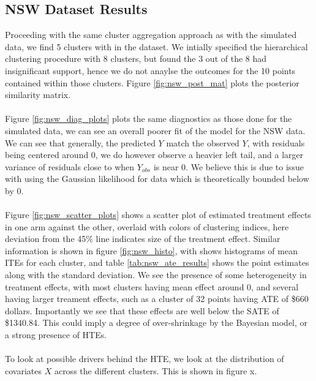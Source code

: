 \documentclass{article}
\begin{document}
\subsection{NSW Dataset Results} 
Proceeding with the same cluster aggregation approach as with the simulated data, we find 5 clusters with in the dataset. We intially specified the hierarchical clustering procedure with 8 clusters, but found the 3 out of the 8 had insignificant support, hence we do not anaylse the outcomes for the 10 points contained within those clusters. Figure \ref{fig:nsw_post_mat} plots the posterior similarity matrix. 
\\ \\
Figure \ref{fig:nsw_diag_plots} plots the same diagnostics as those done for the simulated data, we can see an overall poorer fit of the model for the NSW data. We can see that generally, the predicted $Y$ match the observed $Y$, with residuals being centered around 0, we do however observe a heavier left tail, and a larger variance of residuals close to when $Y_{obs}$ is near 0. We believe this is due to issue with using the Gaussian likelihood for data which is theoretically bounded below by 0.
\\ \\
Figure \ref{fig:nsw_scatter_plots} shows a scatter plot of estimated treatment effects in one arm against the other, overlaid with colors of clustering indices, here deviation from the 45\% line indicates size of the treatment effect. Similar information is shown in figure \ref{fig:nsw_histo}, with shows histograms of mean ITEs for each cluster, and table \ref{tab:nsw_ate_results} shows the point estimates along with the standard deviation. We see the presence of some heterogeneity in treatment effects, with most clusters having mean effect around 0, and several having larger treament effects, such as a cluster of 32 points having ATE of \$660 dollars. Importantly we see that these effects are well below the SATE of \$1340.84. This could imply a degree of over-shrinkage by the Bayesian model, or a strong presence of HTEs. 
\\ \\
To look at possible drivers behind the HTE, we look at the distribution of covariates $X$ across the different clusters. This is shown in figure x.  
\end{document}
